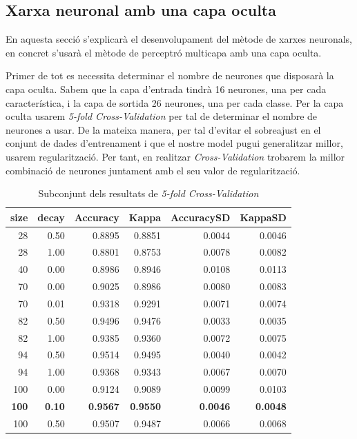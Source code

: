 \subsection{Xarxa neuronal amb una capa oculta}

En aquesta secció s'explicarà el desenvolupament del mètode de xarxes neuronals, en concret s'usarà el mètode de perceptró multicapa amb una capa oculta.

Primer de tot es necessita determinar el nombre de neurones que disposarà la capa oculta. Sabem que la capa d'entrada tindrà 16 neurones, una per cada característica, i la capa de sortida 26 neurones, una per cada classe. Per la capa oculta usarem \textit{5-fold Cross-Validation} per tal de determinar el nombre de neurones a usar. De la mateixa manera, per tal d'evitar el sobreajust en el conjunt de dades d'entrenament i que el nostre model pugui generalitzar millor, usarem regularització. Per tant, en realitzar \textit{Cross-Validation} trobarem la millor combinació de neurones juntament amb el seu valor de regularització.

\begin{table}[ht]
\centering
\begin{adjustbox}{max width=\textwidth}
\begin{tabular}{|r|r|r|r|r|r|}
  \hline
size & decay & Accuracy & Kappa & AccuracySD & KappaSD \\ 
  \hline
  28 & 0.50 & 0.8895 & 0.8851 & 0.0044 & 0.0046 \\ 
  28 & 1.00 & 0.8801 & 0.8753 & 0.0078 & 0.0082 \\ 
  40 & 0.00 & 0.8986 & 0.8946 & 0.0108 & 0.0113 \\ 
  70 & 0.00 & 0.9025 & 0.8986 & 0.0080 & 0.0083 \\ 
  70 & 0.01 & 0.9318 & 0.9291 & 0.0071 & 0.0074 \\ 
  82 & 0.50 & 0.9496 & 0.9476 & 0.0033 & 0.0035 \\ 
  82 & 1.00 & 0.9385 & 0.9360 & 0.0072 & 0.0075 \\ 
  94 & 0.50 & 0.9514 & 0.9495 & 0.0040 & 0.0042 \\ 
  94 & 1.00 & 0.9368 & 0.9343 & 0.0067 & 0.0070 \\ 
  100 & 0.00 & 0.9124 & 0.9089 & 0.0099 & 0.0103 \\ 
  \textbf{100} & \textbf{0.10} & \textbf{0.9567} & \textbf{0.9550} & \textbf{0.0046} & \textbf{0.0048} \\ 
  100 & 0.50 & 0.9507 & 0.9487 & 0.0066 & 0.0068 \\ 
   \hline
\end{tabular}
\end{adjustbox}
\caption{Subconjunt dels resultats de \textit{5-fold Cross-Validation}}
\label{mlpResults}
\end{table}

